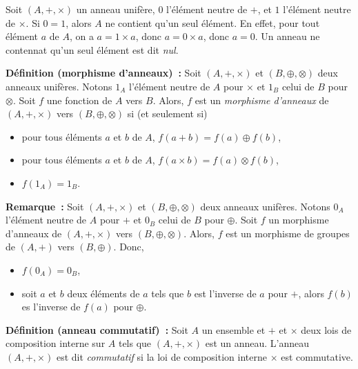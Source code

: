 \medskip

Soit $(A, +, \times)$ un anneau unifère, $0$ l'élément neutre de $+$, et $1$ l'élément neutre de $\times$. 
Si $0 = 1$, alors $A$ ne contient qu'un seul élément. 
En effet, pour tout élément $a$ de $A$, on a $a = 1 \times a$, donc $a = 0 \times a$, donc $a = 0$. 
Un anneau ne contennat qu'un seul élément est dit \textit{nul}. 

\medskip

\noindent\textbf{Définition (morphisme d'anneaux) :} Soit $(A, +, \times)$ et $(B, \oplus, \otimes)$ deux anneaux unifères.
    Notons $1_A$ l'élément neutre de $A$ pour $\times$ et $1_B$ celui de $B$ pour $\otimes$.
    Soit $f$ une fonction de $A$ vers $B$. 
    Alors, $f$ est un \emph{morphisme d'anneaux} de $(A, +, \times)$ vers $(B, \oplus, \otimes)$ si (et seulement si)
    \begin{itemize}[nosep]
        \item pour tous éléments $a$ et $b$ de $A$, $f(a + b) = f(a) \oplus f(b)$,
        \item pour tous éléments $a$ et $b$ de $A$, $f(a \times b) = f(a) \otimes f(b)$,
        \item $f(1_A) = 1_B$.
    \end{itemize}

\medskip

\noindent\textbf{Remarque :} Soit $(A, +, \times)$ et $(B, \oplus, \otimes)$ deux anneaux unifères.
    Notons $0_A$ l'élément neutre de $A$ pour $+$ et $0_B$ celui de $B$ pour $\oplus$.
    Soit $f$ un morphisme d'anneaux de $(A, +, \times)$ vers $(B, \oplus, \otimes)$.
    Alors, $f$ est un morphisme de groupes de $(A, +)$ vers $(B, \oplus)$.
    Donc, 
    \begin{itemize}[nosep]
        \item $f(0_A) = 0_B$, 
        \item soit $a$ et $b$ deux éléments de $a$ tels que $b$ est l'inverse de $a$ pour $+$, alors $f(b)$ es l'inverse de $f(a)$ pour $\oplus$.
    \end{itemize}

\medskip

\noindent\textbf{Définition (anneau commutatif) :} Soit $A$ un ensemble et $+$ et $\times$ deux lois de composition interne sur $A$ tels que $(A, +, \times)$ est un anneau. 
    L'anneau $(A, +, \times)$ est dit \textit{commutatif} si la loi de composition interne $\times$ est commutative.

\medskip

